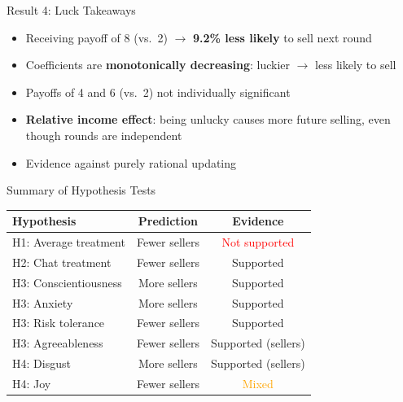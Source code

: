 \documentclass{beamer}
\begin{document}
\begin{frame}{Result 4: Luck Takeaways}
\begin{itemize}
    \item Receiving payoff of 8 (vs.\ 2) $\rightarrow$ \textbf{9.2\% less likely} to sell next round
    \item Coefficients are \textbf{monotonically decreasing}: luckier $\rightarrow$ less likely to sell
    \item Payoffs of 4 and 6 (vs.\ 2) not individually significant
    \item \textbf{Relative income effect}: being unlucky causes more future selling, even though rounds are independent
    \item Evidence against purely rational updating
\end{itemize}
\end{frame}



\begin{frame}{Summary of Hypothesis Tests}
\begin{center}
\begin{tabular}{lcc}
\toprule
\textbf{Hypothesis} & \textbf{Prediction} & \textbf{Evidence} \\
\midrule
H1: Average treatment & Fewer sellers & \textcolor{red}{Not supported} \\
H2: Chat treatment & Fewer sellers & \textcolor{green!50!black}{Supported} \\
H3: Conscientiousness & More sellers & \textcolor{green!50!black}{Supported} \\
H3: Anxiety & More sellers & \textcolor{green!50!black}{Supported} \\
H3: Risk tolerance & Fewer sellers & \textcolor{green!50!black}{Supported} \\
H3: Agreeableness & Fewer sellers & \textcolor{green!50!black}{Supported (sellers)} \\
H4: Disgust & More sellers & \textcolor{green!50!black}{Supported (sellers)} \\
H4: Joy & Fewer sellers & \textcolor{orange}{Mixed} \\
\bottomrule
\end{tabular}
\end{center}
\end{frame}
\end{document}
